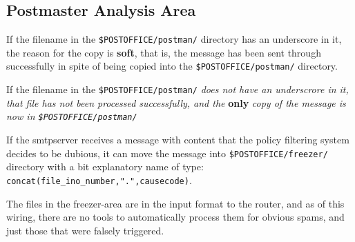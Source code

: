 \subsection{Postmaster Analysis Area\label{postmaster_analysis_area}}



If the filename in the {\tt \$POSTOFFICE/postman/} directory has an 
underscore in it, the reason for the copy is {\bf soft}, that is, the 
message has been sent through successfully in spite of being copied into
the {\tt \$POSTOFFICE/postman/} directory.

If the filename in the {\tt \$POSTOFFICE/postman/}
{\em does not have an underscrore in it, that file has not been processed
successfully, and the} {\bf only} {\em copy of the message
is now in {\tt \$POSTOFFICE/postman/}}

If the  smtpserver  receives a message with content that the policy filtering
system decides to be dubious, it can move the message into
{\tt \$POSTOFFICE/freezer/} directory with a bit explanatory name of type:
{\small\tt concat(file\_ino\_number,".",causecode)}.

The files in the freezer-area are in the input format to the router, and
as of this wiring, there are no tools to automatically process them for
obvious spams, and just those that were falsely triggered.
